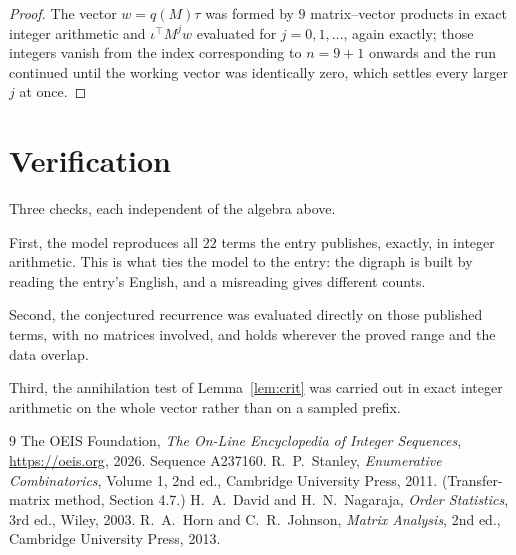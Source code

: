 \documentclass[11pt,a4paper]{article}
\theoremstyle{plain}
\theoremstyle{definition}
\begin{document}
\begin{proof}
The vector $w=q(M)\tau$ was formed by $9$ matrix--vector products in exact integer
arithmetic and $\iota^{\!\top}M^{j}w$ evaluated for $j=0,1,\dots$, again exactly; those
integers vanish from the index corresponding to $n=9+1$ onwards and the run continued
until the working vector was identically zero, which settles every larger $j$ at once.
\end{proof}

\section{Verification}

Three checks, each independent of the algebra above.

First, the model reproduces all $22$ terms the entry publishes, exactly, in integer
arithmetic. This is what ties the model to the entry: the digraph is built by reading the
entry's English, and a misreading gives different counts.

Second, the conjectured recurrence was evaluated directly on those published terms, with no
matrices involved, and holds wherever the proved range and the data overlap.

Third, the annihilation test of Lemma~\ref{lem:crit} was carried out in exact integer
arithmetic on the whole vector rather than on a sampled prefix.

\begin{thebibliography}{9}
 The OEIS Foundation, \emph{The On-Line Encyclopedia of Integer
Sequences}, \url{https://oeis.org}, 2026. Sequence A237160.
 R.~P.~Stanley, \emph{Enumerative Combinatorics}, Volume 1, 2nd ed.,
Cambridge University Press, 2011. (Transfer-matrix method, Section 4.7.)
 H.~A.~David and H.~N.~Nagaraja, \emph{Order Statistics}, 3rd ed., Wiley,
2003.
 R.~A.~Horn and C.~R.~Johnson, \emph{Matrix Analysis}, 2nd ed., Cambridge
University Press, 2013.
\end{thebibliography}
\end{document}
